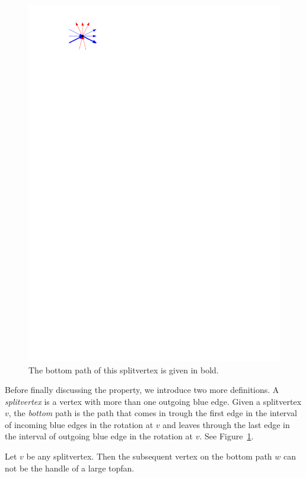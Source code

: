     \begin{figure}
      \centering
      \includegraphics[scale=.9]{unifiedAlgo/img/sweep/bottompath.pdf}
      \caption{The bottom path of this splitvertex is given in bold.}
      \label{fig:sweep:bottomPath}
    \end{figure}

    Before finally discussing the property, we introduce two more definitions.
    A \emph{splitvertex} is a vertex with more than one outgoing blue edge.
    Given a splitvertex $v$, the \emph{bottom} path is the path that comes in trough the first edge in the interval of incoming blue edges in the rotation at $v$ and leaves through the last edge in the interval of outgoing blue edge in the rotation at $v$.
    See Figure~\ref{fig:sweep:bottomPath}.

    \begin{lemma}
      \label{lm:sweep:NoTwoSplitsAboveEachOther}
      Let $v$ be any splitvertex. Then the subsequent vertex on the bottom path $w$ can not be the handle of a large topfan.
    \end{lemma}

